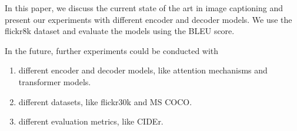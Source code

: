 \documentclass[12pt]{article}
\theoremstyle{plain}
\theoremstyle{definition}
\theoremstyle{remark}
\begin{document}
In this paper, we discuss the current state of the art in image captioning and present our experiments with different encoder and decoder models. We use the flickr8k dataset and evaluate the models using the BLEU score.

In the future, further experiments could be conducted with
\begin{enumerate}
    \item different encoder and decoder models, like attention mechanisms and transformer models.
    \item different datasets, like flickr30k and MS COCO.
    \item different evaluation metrics, like CIDEr.
\end{enumerate}


\newpage
\thispagestyle{empty}



\end{document}
